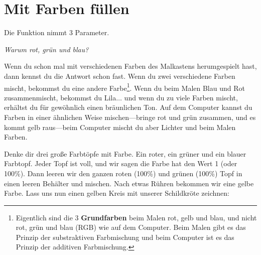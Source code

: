 \section{Mit Farben füllen}
Die  Funktion nimmt 3 Parameter.
\par
\emph{Warum rot, grün und blau?}
\par
Wenn du schon mal mit verschiedenen Farben des Malkastens herumgespielt hast, dann kennst du die Antwort schon fast. Wenn du zwei verschiedene Farben mischt, bekommst du eine andere Farbe\footnote{Eigentlich sind die 3 \textbf{Grundfarben} beim Malen rot, gelb und blau, und nicht rot, grün und blau (RGB) wie auf dem Computer. Beim Malen gibt es das Prinzip der substraktiven Farbmischung und beim Computer ist es das Prinzip der additiven Farbmischung.}. Wenn du beim Malen Blau und Rot zusammenmischt, bekommst du Lila$\ldots$ und wenn du zu viele Farben mischt, erhältst du für gewöhnlich einen bräunlichen Ton. Auf dem Computer kannst du Farben in einer ähnlichen Weise mischen---bringe rot und grün zusammen, und es kommt gelb raus---beim Computer mischt du aber Lichter und beim Malen Farben.

Denke dir drei große Farbtöpfe mit Farbe. Ein roter, ein grüner und ein blauer Farbtopf. Jeder Topf ist voll, und wir sagen die Farbe hat den Wert 1 (oder 100\%). Dann leeren wir den ganzen roten (100\%) und grünen (100\%) Topf in einen leeren Behälter und mischen. Nach etwas Rühren bekommen wir eine gelbe Farbe. Lass uns nun einen gelben Kreis mit unserer Schildkröte zeichnen:

